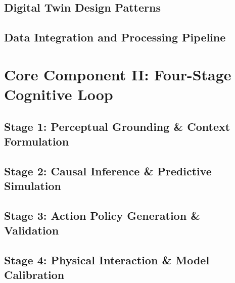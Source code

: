 \subsection{Digital Twin Design Patterns}

\subsection{Data Integration and Processing Pipeline}

\section{Core Component II: Four-Stage Cognitive Loop}

\subsection{Stage 1: Perceptual Grounding \& Context Formulation}

\subsection{Stage 2: Causal Inference \& Predictive Simulation}

\subsection{Stage 3: Action Policy Generation \& Validation}

\subsection{Stage 4: Physical Interaction \& Model Calibration}

